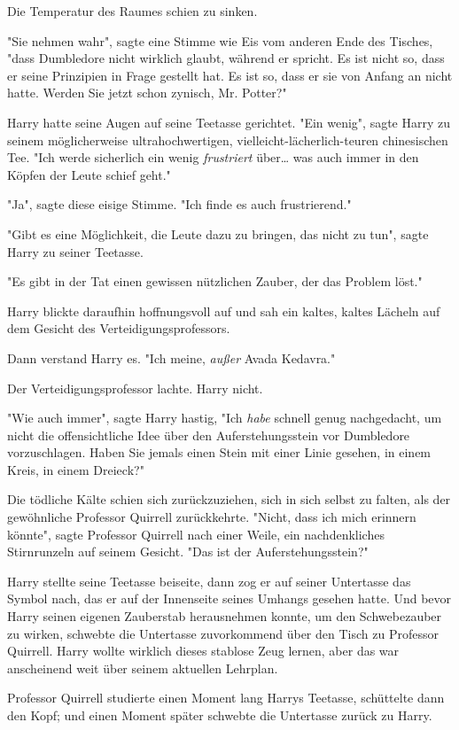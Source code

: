{Die Temperatur des Raumes schien zu sinken.

"Sie nehmen wahr", sagte eine Stimme wie Eis vom anderen Ende des Tisches, "dass Dumbledore nicht wirklich glaubt, während er spricht. Es ist nicht so, dass er seine Prinzipien in Frage gestellt hat. Es ist so, dass er sie von Anfang an nicht hatte. Werden Sie jetzt schon zynisch, Mr. Potter?"

Harry hatte seine Augen auf seine Teetasse gerichtet. "Ein wenig", sagte Harry zu seinem möglicherweise ultrahochwertigen, vielleicht-lächerlich-teuren chinesischen Tee. "Ich werde sicherlich ein wenig \emph{frustriert} über… was auch immer in den Köpfen der Leute schief geht."

"Ja", sagte diese eisige Stimme. "Ich finde es auch frustrierend."

"Gibt es eine Möglichkeit, die Leute dazu zu bringen, das nicht zu tun", sagte Harry zu seiner Teetasse.

"Es gibt in der Tat einen gewissen nützlichen Zauber, der das Problem löst."

Harry blickte daraufhin hoffnungsvoll auf und sah ein kaltes, kaltes Lächeln auf dem Gesicht des Verteidigungsprofessors.

Dann verstand Harry es. "Ich meine, \emph{außer} Avada Kedavra."

Der Verteidigungsprofessor lachte. Harry nicht.

"Wie auch immer", sagte Harry hastig, "Ich \emph{habe} schnell genug nachgedacht, um nicht die offensichtliche Idee über den Auferstehungsstein vor Dumbledore vorzuschlagen. Haben Sie jemals einen Stein mit einer Linie gesehen, in einem Kreis, in einem Dreieck?"

Die tödliche Kälte schien sich zurückzuziehen, sich in sich selbst zu falten, als der gewöhnliche Professor Quirrell zurückkehrte. "Nicht, dass ich mich erinnern könnte", sagte Professor Quirrell nach einer Weile, ein nachdenkliches Stirnrunzeln auf seinem Gesicht. "Das ist der Auferstehungsstein?"

Harry stellte seine Teetasse beiseite, dann zog er auf seiner Untertasse das Symbol nach, das er auf der Innenseite seines Umhangs gesehen hatte. Und bevor Harry seinen eigenen Zauberstab herausnehmen konnte, um den Schwebezauber zu wirken, schwebte die Untertasse zuvorkommend über den Tisch zu Professor Quirrell. Harry wollte wirklich dieses stablose Zeug lernen, aber das war anscheinend weit über seinem aktuellen Lehrplan.

Professor Quirrell studierte einen Moment lang Harrys Teetasse, schüttelte dann den Kopf; und einen Moment später schwebte die Untertasse zurück zu Harry.

}
